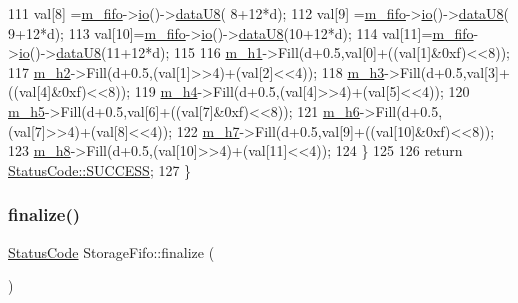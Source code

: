 \begin{DoxyCode}
111     val[8] =\hyperlink{classStorageFifo_a4b1f3eb44df4f2d46a8a62189d662390}{m\_fifo}->\hyperlink{classIOobject_af04fb94137c3d86849f478ac5afab5d1}{io}()->\hyperlink{classIOdata_a75e9c318dbac3a39402179070943d4bc}{dataU8}( 8+12*d);
112     val[9] =\hyperlink{classStorageFifo_a4b1f3eb44df4f2d46a8a62189d662390}{m\_fifo}->\hyperlink{classIOobject_af04fb94137c3d86849f478ac5afab5d1}{io}()->\hyperlink{classIOdata_a75e9c318dbac3a39402179070943d4bc}{dataU8}( 9+12*d);
113     val[10]=\hyperlink{classStorageFifo_a4b1f3eb44df4f2d46a8a62189d662390}{m\_fifo}->\hyperlink{classIOobject_af04fb94137c3d86849f478ac5afab5d1}{io}()->\hyperlink{classIOdata_a75e9c318dbac3a39402179070943d4bc}{dataU8}(10+12*d);
114     val[11]=\hyperlink{classStorageFifo_a4b1f3eb44df4f2d46a8a62189d662390}{m\_fifo}->\hyperlink{classIOobject_af04fb94137c3d86849f478ac5afab5d1}{io}()->\hyperlink{classIOdata_a75e9c318dbac3a39402179070943d4bc}{dataU8}(11+12*d);
115     
116     \hyperlink{classStorageFifo_abe762844e442bc8188643b18b276d801}{m\_h1}->Fill(d+0.5,val[0]+((val[1]&0xf)<<8));
117     \hyperlink{classStorageFifo_a3caf6211541aaa4be8e60c03d79bf253}{m\_h2}->Fill(d+0.5,(val[1]>>4)+(val[2]<<4));
118     \hyperlink{classStorageFifo_a7e6b54c96a9b53a9917f7f21bda12b2e}{m\_h3}->Fill(d+0.5,val[3]+((val[4]&0xf)<<8));
119     \hyperlink{classStorageFifo_ad026ffc1c7590bb3563538490be9aa00}{m\_h4}->Fill(d+0.5,(val[4]>>4)+(val[5]<<4));
120     \hyperlink{classStorageFifo_ae9133c5421f9fa166b837933706d2a59}{m\_h5}->Fill(d+0.5,val[6]+((val[7]&0xf)<<8));
121     \hyperlink{classStorageFifo_a39ca376b2a74643c54e4df2dfabf0906}{m\_h6}->Fill(d+0.5,(val[7]>>4)+(val[8]<<4));
122     \hyperlink{classStorageFifo_a01784ff4138a1b32eb517931b5866cc6}{m\_h7}->Fill(d+0.5,val[9]+((val[10]&0xf)<<8));
123     \hyperlink{classStorageFifo_aeef4b7183e14d05bab673d948d85b84c}{m\_h8}->Fill(d+0.5,(val[10]>>4)+(val[11]<<4));
124   \}
125   
126   \textcolor{keywordflow}{return} \hyperlink{classStatusCode_a6f565cbeadc76d14c72f047e5e85eb4badd0da38d3ba0d922efd1f4619bc37ad8}{StatusCode::SUCCESS};
127 \}
\end{DoxyCode}
\mbox{\label{classStorageFifo_aaa04959087ffc774dbb713f9910c6c04}} 
\subsubsection{\texorpdfstring{finalize()}{finalize()}}
{\footnotesize\ttfamily \hyperlink{classStatusCode}{Status\+Code} Storage\+Fifo\+::finalize (\begin{DoxyParamCaption}{ }\end{DoxyParamCaption})\hspace{0.3cm}{\ttfamily [virtual]}}

